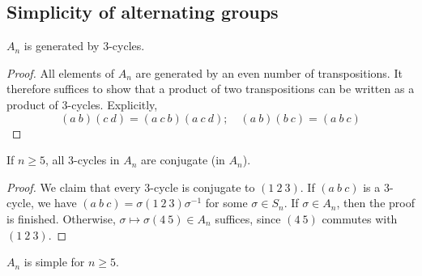 \subsection{Simplicity of alternating groups}
\begin{lemma}
	\( A_n \) is generated by 3-cycles.
\end{lemma}
\begin{proof}
	All elements of \( A_n \) are generated by an even number of transpositions.
	It therefore suffices to show that a product of two transpositions can be written as a product of 3-cycles.
	Explicitly,
	\[
		(a\ b)(c\ d) = (a\ c\ b)(a\ c\ d);\quad (a\ b)(b\ c) = (a\ b\ c)
	\]
\end{proof}
\begin{lemma}
	If \( n \geq 5 \), all 3-cycles in \( A_n \) are conjugate (in \( A_n \)).
\end{lemma}
\begin{proof}
	We claim that every 3-cycle is conjugate to \( (1\ 2\ 3) \).
	If \( (a\ b\ c) \) is a 3-cycle, we have \( (a\ b\ c) = \sigma(1\ 2\ 3)\sigma^{-1} \) for some \( \sigma \in S_n \).
	If \( \sigma \in A_n \), then the proof is finished.
	Otherwise, \( \sigma \mapsto \sigma(4\ 5) \in A_n \) suffices, since \( (4\ 5) \) commutes with \( (1\ 2\ 3) \).
\end{proof}
\begin{theorem}
	\( A_n \) is simple for \( n \geq 5 \).
\end{theorem}
